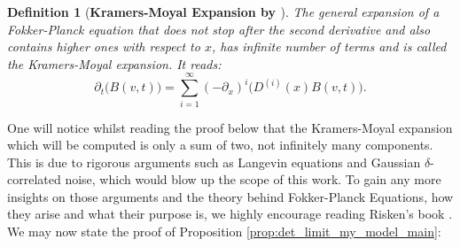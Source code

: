 \documentclass[12pt,a4paper,twoside]{article}
\newtheorem{definition}{Definition}[section]
\begin{document}
\begin{definition}[\textbf{Kramers-Moyal Expansion by \cite{Risken1989}}]
	The general expansion of a Fokker-Planck equation that does not stop after the second derivative and also contains higher ones with respect to $x$, has infinite number of terms and is called the Kramers-Moyal expansion. It reads:
	\begin{equation*}
		\partial_t\big(B\left(v,t\right)\big) = \sum_{i = 1}^{\infty}\left(-\partial_x\right)^i \big(D^{(i)}(x) B\left(v,t\right)\big).
	\end{equation*}
\end{definition}

One will notice whilst reading the proof below that the Kramers-Moyal expansion which will be computed is only a sum of two, not infinitely many components. This is due to rigorous arguments such as Langevin equations and Gaussian $\delta$-correlated noise, which would blow up the scope of this work. To gain any more insights on those arguments and the theory behind Fokker-Planck Equations, how they arise and what their purpose is, we highly encourage reading Risken's book \cite{Risken1989}. We may now state the proof of Proposition \ref{prop:det_limit_my_model_main}:
\end{document}

